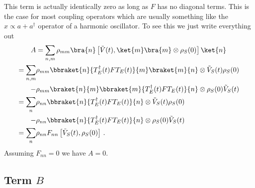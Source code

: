 This term is actually identically zero as long as $F$ has no diagonal terms.
This is the case for most coupling operators which are usually something like the $x \propto a + a^\dagger$ operator of a harmonic oscillator.
To see this we just write everything out
\begin{align}
A
&= \sum_{n,m} \rho_{mm} \bra{n} \left[ \tilde{V}(t), \ket{m}\bra{m}\otimes \rho_S(0) \right] \ket{n} \\
= \sum_{n,m} &\rho_{mm}
\bbraket{n}{T^\dagger_E(t) F T_E(t)}{m}\braket{m}{n}
\otimes \tilde{V}_S(t) \rho_S(0) \nonumber \\
- &\rho_{mm} \braket{n}{m} \bbraket{m}{T_E^\dagger(t) F T_E(t)}{n} \otimes \rho_S(0) \tilde{V}_S(t) \\
= \sum_n &\rho_{nn} \bbraket{n}{T_E^\dagger(t) F T_E(t)}{n} \otimes \tilde{V}_S(t) \rho_S(0) \nonumber \\
- &\rho_{nn} \bbraket{n}{T_E^\dagger(t) F T_E(t)}{n} \otimes \rho_S(0) \tilde{V}_S(t) \\
= \sum_n &\rho_{nn} F_{nn} \left[ \tilde{V}_S(t), \rho_S(0) \right] \, .
\end{align}
Assuming $F_{nn}=0$ we have $A = 0$.


\subsection{Term $B$}

